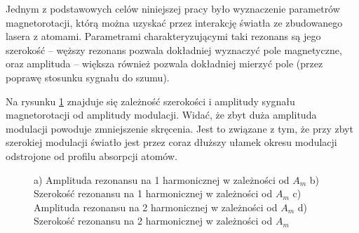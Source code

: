 \documentclass[a4paper,10pt,twoside]{report}
\begin{document}
Jednym z podstawowych celów niniejszej pracy było wyznaczenie parametrów magnetorotacji, którą można uzyskać przez interakcję światła ze zbudowanego lasera z atomami.
Parametrami charakteryzującymi taki rezonans są jego  szerokość -- węższy rezonans pozwala dokładniej wyznaczyć pole magnetyczne, oraz amplituda -- większa również pozwala dokładniej mierzyć pole (przez poprawę stosunku sygnału do szumu).

Na rysunku \ref{wykresikioda} znajduje się zależność szerokości i amplitudy sygnału magnetorotacji od amplitudy modulacji. Widać, że zbyt duża amplituda modulacji powoduje zmniejszenie skręcenia. Jest to związane z tym, że przy zbyt szerokiej modulacji światło jest przez coraz dłuższy ułamek okresu modulacji odstrojone od profilu absorpcji atomów. 

\begin{figure}[h!]

\centering
{}


\label{wykresikioda}
\caption{ a) Amplituda rezonansu na 1 harmonicznej w zależności od $A_m$ b) Szerokość rezonansu na 1 harmonicznej w zależności od $A_m$ 
c) Amplituda rezonansu na 2 harmonicznej w zależności od $A_m$ d) Szerokość rezonansu na 2 harmonicznej w zależności od $A_m$}

\end{figure}
\end{document}

